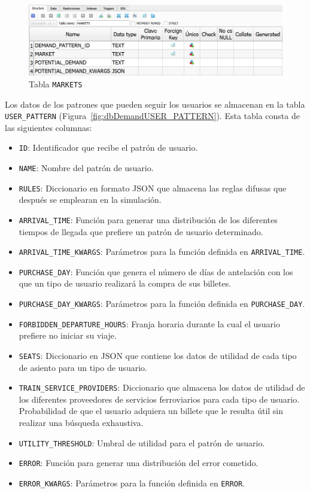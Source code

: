 \begin{figure}[htbp]
\centering
\includegraphics[width=.9\textwidth]{fig/Tablas base de datos/Demanda/MARKETS.png}
\caption{Tabla \texttt{MARKETS}}
\label{fig:dbDemandMARKETS}
\end{figure}

Los datos de los patrones que pueden seguir los usuarios se almacenan en la tabla \texttt{USER\_PATTERN} (Figura~\ref{fig:dbDemandUSER_PATTERN}). Esta tabla consta de las siguientes columnas:
\begin{itemize}
    \item \texttt{ID}: Identificador que recibe el patrón de usuario.
    \item \texttt{NAME}: Nombre del patrón de usuario.
    \item \texttt{RULES}: Diccionario en formato \acrshort{JSON} que almacena las reglas difusas que después se emplearan en la simulación.
    \item \texttt{ARRIVAL\_TIME}: Función para generar una distribución de los diferentes tiempos de llegada que prefiere un patrón de usuario determinado.
    \item \texttt{ARRIVAL\_TIME\_KWARGS}: Parámetros para la función definida en \texttt{ARRIVAL\_TIME}.
    \item \texttt{PURCHASE\_DAY}: Función que genera el número de días de antelación con los que un tipo de usuario realizará la compra de sus billetes.
    \item \texttt{PURCHASE\_DAY\_KWARGS}: Parámetros para la función definida en \texttt{PURCHASE\_DAY}.
    \item \texttt{FORBIDDEN\_DEPARTURE\_HOURS}: Franja horaria durante la cual el usuario prefiere no iniciar su viaje.
    \item \texttt{SEATS}: Diccionario en \acrshort{JSON} que contiene los datos de utilidad de cada tipo de asiento para un tipo de usuario.
    \item \texttt{TRAIN\_SERVICE\_PROVIDERS}: Diccionario que almacena los datos de utilidad de los diferentes proveedores de servicios ferroviarios para cada tipo de usuario. Probabilidad de que el usuario adquiera un billete que le resulta útil sin realizar una búsqueda exhaustiva.
    \item \texttt{UTILITY\_THRESHOLD}: Umbral de utilidad para el patrón de usuario.
    \item \texttt{ERROR}: Función para generar una distribución del error cometido.
    \item \texttt{ERROR\_KWARGS}: Parámetros para la función definida en \texttt{ERROR}.
\end{itemize}

